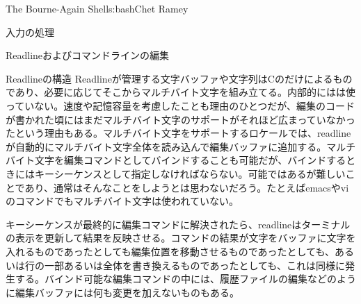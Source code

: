 \begin{aosachapter}{The Bourne-Again Shell}{s:bash}{Chet Ramey}
\begin{aosasect1}{入力の処理}
\begin{aosasect2}{Readlineおよびコマンドラインの編集}
\begin{aosasect3}{Readlineの構造}
Readlineが管理する文字バッファや文字列はCのだけによるものであり、必要に応じてそこからマルチバイト文字を組み立てる。内部的にはは使っていない。速度や記憶容量を考慮したことも理由のひとつだが、編集のコードが書かれた頃にはまだマルチバイト文字のサポートがそれほど広まっていなかったという理由もある。マルチバイト文字をサポートするロケールでは、readlineが自動的にマルチバイト文字全体を読み込んで編集バッファに追加する。マルチバイト文字を編集コマンドとしてバインドすることも可能だが、バインドするときにはキーシーケンスとして指定しなければならない。可能ではあるが難しいことであり、通常はそんなことをしようとは思わないだろう。たとえばemacsやviのコマンドでもマルチバイト文字は使われていない。

キーシーケンスが最終的に編集コマンドに解決されたら、readlineはターミナルの表示を更新して結果を反映させる。コマンドの結果が文字をバッファに文字を入れるものであったとしても編集位置を移動させるものであったとしても、あるいは行の一部あるいは全体を書き換えるものであったとしても、これは同様に発生する。バインド可能な編集コマンドの中には、履歴ファイルの編集などのように編集バッファには何も変更を加えないものもある。


\end{aosasect3}
\end{aosasect2}
\end{aosasect1}
\end{aosachapter}
